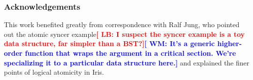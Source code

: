 \documentclass[runningheads]{llncs}
\newcommand{\wm}[1]{\textbf{\textcolor{blue}{[ WM: #1]}}}
\newcommand{\LB}[1]{\textbf{\textcolor{red}{[ LB: #1]}}}
\begin{document}
\subsubsection{Acknowledgements} This work benefited greatly from correspondence with Ralf Jung, who pointed out the atomic syncer example\LB{I suspect the syncer example is a toy data structure, far simpler than a BST?}\wm{It's a generic higher-order function that wraps the argument in a critical section. We're specializing it to a particular data structure here.}  and explained the finer points of logical atomicity in Iris.


\end{document}
